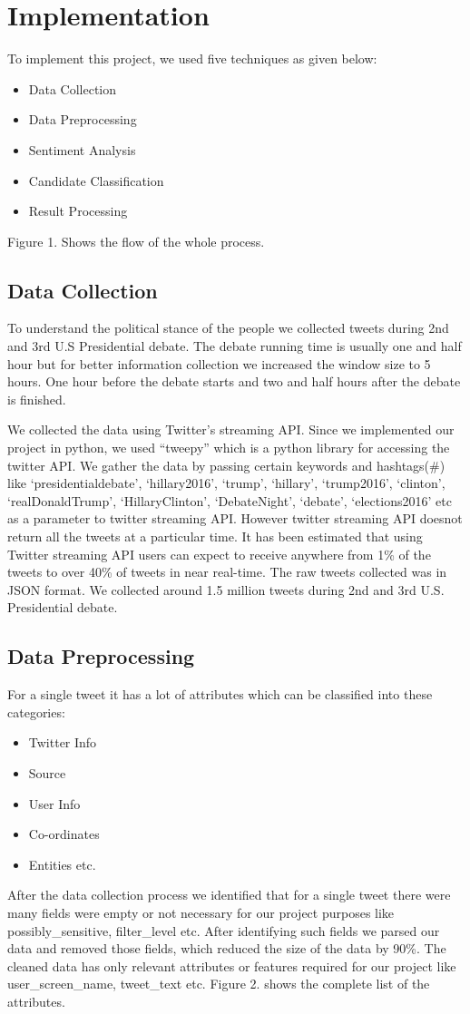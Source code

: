 \documentclass{acm_proc_article-sp}
\begin{document}
\section{Implementation}
To implement this project, we used five techniques as given below:
\begin{itemize}
\item Data Collection
\item Data Preprocessing
\item Sentiment Analysis
\item Candidate Classification
\item Result Processing  
\end{itemize}
Figure 1. Shows the flow of the whole process.
\subsection{Data Collection}
To understand the political stance of the people we collected tweets during 2nd and 3rd U.S Presidential debate. The debate running time is usually one and half hour but for better information collection we increased the window size to 5 hours. One hour before the debate starts and two and half hours after the debate is finished. 

We collected the data using Twitter's streaming API. Since we implemented our project in python, we used ``tweepy'' which is a python library for accessing the twitter API. We gather the data by passing certain keywords and hashtags(\#) like `presidentialdebate', `hillary2016', `trump', `hillary', `trump2016', `clinton', `realDonaldTrump', `HillaryClinton', `DebateNight', `debate', `elections2016' etc as a parameter to twitter streaming API. However twitter streaming API doesnot return all the tweets at a particular time. It has been estimated that using Twitter streaming API users can expect to receive anywhere from 1\% of the tweets to over 40\% of tweets in near real-time.\cite{bplanet:tfvta} The raw tweets collected was in JSON format. We collected around 1.5 million tweets during 2nd and 3rd U.S. Presidential debate.


\subsection{Data Preprocessing}
For a single tweet it has a lot of attributes which can be classified into these categories:
\begin{itemize}
	\item Twitter Info
	\item Source
	\item User Info
	\item Co-ordinates
	\item Entities etc. 
\end{itemize}
 After the data collection process we identified that for a single tweet there were many fields were empty or not necessary for our project purposes like possibly\_sensitive, filter\_level etc. After identifying such fields we parsed our data and removed those fields, which reduced the size of the data by 90\%. The cleaned data has only relevant attributes or features required for our project like user\_screen\_name, tweet\_text etc. Figure 2. shows the complete list of the attributes.
\end{document}
